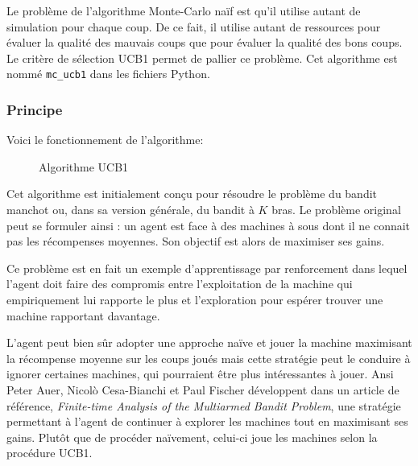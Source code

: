 \documentclass[a4paper]{article}
\theoremstyle{definition}
\begin{document}
Le problème de l'algorithme Monte-Carlo naïf est qu'il utilise autant de simulation pour chaque coup. De ce fait, il utilise autant de ressources pour évaluer la qualité des mauvais coups que pour évaluer la qualité des bons coups. Le critère de sélection UCB1 permet de pallier ce problème.
Cet algorithme est nommé \texttt{mc\_ucb1} dans les fichiers Python.

\subsubsection{Principe}

Voici le fonctionnement de l'algorithme: 

\begin{figure}[h]
	\noindent{}
	\caption{Algorithme UCB1}
\end{figure}

Cet algorithme est initialement conçu pour résoudre le problème du bandit manchot ou, dans sa version générale, du bandit à $K$ bras. Le problème original peut se formuler ainsi : un agent est face à des machines à sous dont il ne connait pas les récompenses moyennes. Son objectif est alors de maximiser ses gains.

Ce problème est en fait un exemple d'apprentissage par renforcement dans lequel l'agent doit faire des compromis entre l'exploitation de la machine qui empiriquement lui rapporte le plus et l'exploration pour espérer trouver une machine rapportant davantage.

L'agent peut bien sûr adopter une approche naïve et jouer la machine maximisant la récompense moyenne sur les coups joués mais  cette stratégie peut le conduire à ignorer certaines machines, qui pourraient être plus intéressantes à jouer. Ansi \\

Peter Auer, Nicol\`o Cesa-Bianchi et Paul Fischer développent dans un article de référence, \textit{Finite-time Analysis of the Multiarmed Bandit Problem}, une stratégie permettant à l'agent de continuer à explorer les machines tout en maximisant ses gains. Plutôt que de procéder naïvement, celui-ci joue les machines selon la procédure UCB1.\\
\end{document}
